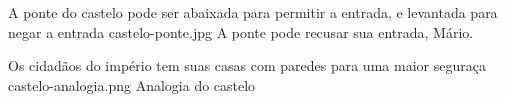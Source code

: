 		{A ponte do castelo pode ser abaixada para permitir a entrada, e levantada para negar a entrada}
		{castelo-ponte.jpg}
		{A ponte pode recusar sua entrada, Mário.}

		{Os cidadãos do império tem suas casas com paredes para uma maior seguraça}
		{castelo-analogia.png}
		{Analogia do castelo \cite{tcpip}}

